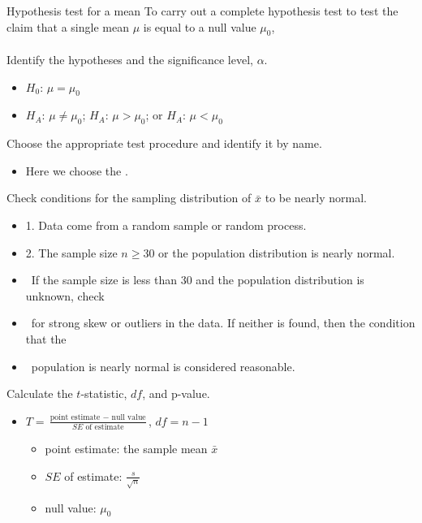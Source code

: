\begin{onebox}{Hypothesis test for a mean}
To carry out a complete hypothesis test to test the claim that a single mean $\mu$ is equal to a null value $\mu_0$,
\\
\\
 Identify the hypotheses and the significance level, $\alpha$.\vspace{-1mm}
\begin{itemize}
\setlength{\itemsep}{0mm}
\item[] $H_0$: $\mu = \mu_0$  
\item[]  $H_A$: $\mu \ne \mu_0$;  \quad $H_A$: $\mu > \mu_0$; \quad or \quad $H_A$: $\mu < \mu_0$ 
\end{itemize} 
 Choose the appropriate test procedure and identify it by name. \vspace{-1mm}
\begin{itemize}
\item[] Here we choose the .
\end{itemize}
  Check conditions for the sampling distribution of $\bar{x}$ to be nearly normal.\vspace{-1mm}
\begin{itemize}
\setlength{\itemsep}{0mm}
\item[] 1. Data come from a random sample or random process.
\item[] 2. The sample size $n\ge 30$ or the population distribution is nearly normal.
\item[] \quad \ If the sample size is less than 30 and the population distribution is unknown, check 
\item[] \quad \ for strong skew or outliers in the data.  If neither is found, then the condition that the 
\item[] \quad \ population is nearly normal is considered reasonable.  
\end{itemize}
  Calculate the $t$-statistic, $df$, and p-value.
\begin{itemize}
\item[] $T = \frac{\text{point estimate } - \text{ null value}}{SE \text{ of estimate}}$,  \quad $df=n-1$
\begin{itemize}
\item[] point estimate:  the sample mean $\bar{x}$
\item[] $SE$ of estimate:  $\frac{s}{\sqrt{n}}$
\item[] null value: $\mu_0$

\end{itemize}
\end{itemize}
\end{onebox}
